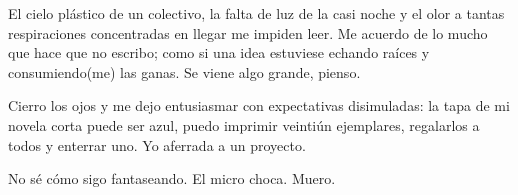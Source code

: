 
El cielo plástico de un colectivo, la falta de luz de la casi noche y el olor
a tantas respiraciones concentradas en llegar me impiden leer. Me acuerdo de 
lo mucho que hace que no escribo; como si una idea estuviese echando raíces y
consumiendo(me) las ganas. Se viene algo grande, pienso.

Cierro los ojos y me dejo entusiasmar con expectativas disimuladas: la tapa 
de mi novela corta puede ser azul, puedo imprimir veintiún ejemplares,
regalarlos a todos y enterrar uno. Yo aferrada a un proyecto.

No sé cómo sigo fantaseando. El micro choca. Muero.
